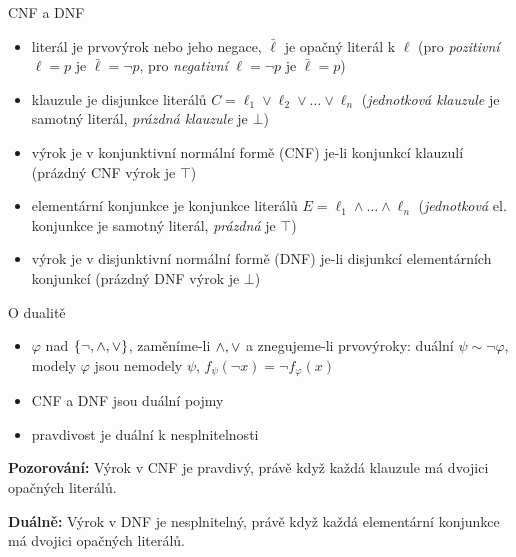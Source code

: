\documentclass{beamer}
\begin{document}
\begin{frame}{CNF a DNF}

    \pause
    \begin{itemize}[<+->]
        \item \alert{literál} je prvovýrok nebo jeho negace, 
        $\bar \ell$ je \alert{opačný literál} k $\ell$ (pro \emph{pozitivní} $\ell=p$ je $\bar \ell=\neg p$, pro \emph{negativní}  $\ell=\neg p$  je $\bar \ell=p$)
        \item \alert{klauzule} je disjunkce literálů $C=\ell_1\lor\ell_2\lor\dots\lor\ell_n$ 
        (\emph{jednotková klauzule} je samotný literál, \emph{prázdná klauzule} je $\bot$)
        \item výrok je v \alert{konjunktivní normální formě} (\alert{CNF}) je-li konjunkcí klauzulí (prázdný CNF výrok je $\top$)
        \item \alert{elementární konjunkce} je konjunkce literálů $E=\ell_1\land\dots\land\ell_n$ (\emph{jednotková} el. konjunkce je samotný literál,  \emph{prázdná} je $\top$)
        \item výrok je v \alert{disjunktivní normální formě} (\alert{DNF}) je-li disjunkcí elementárních konjunkcí (prázdný DNF výrok je $\bot$)
    \end{itemize}


\end{frame}


\begin{frame}{O dualitě}

    \vspace{-12pt}

    \pause
    \begin{itemize}
        \item $\varphi$ nad $\{\neg,{\land},{\lor}\}$, zaměníme-li ${\land},{\lor}$ a znegujeme-li prvovýroky: \alert{duální} $\psi\sim\neg\varphi$, modely $\varphi$ jsou nemodely $\psi$, $f_\psi(\neg x)=\neg f_\varphi(x)$
        \item CNF a DNF jsou duální pojmy
        \item \alert{pravdivost} je duální k \alert{nesplnitelnosti} 
    \end{itemize}

    \pause
    \textbf{Pozorování:} Výrok v CNF je \alert{pravdivý}, právě když každá klauzule má dvojici opačných literálů.

    \pause
    \textbf{Duálně:} Výrok v DNF je \alert{nesplnitelný}, právě když každá elementární konjunkce má dvojici opačných literálů.
       
\end{frame}
\end{document}
